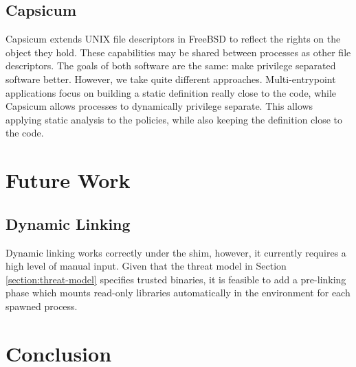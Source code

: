 \documentclass[sigplan]{acmart}
\begin{document}
\subsection{Capsicum}

Capsicum \citep{watson_capsicum_2010} extends UNIX file descriptors in FreeBSD to reflect the rights on the object they hold. These capabilities may be shared between processes as other file descriptors. The goals of both software are the same: make privilege separated software better. However, we take quite different approaches. Multi-entrypoint applications focus on building a static definition really close to the code, while Capsicum allows processes to dynamically privilege separate. This allows applying static analysis to the policies, while also keeping the definition close to the code.

\section{Future Work}

\subsection{Dynamic Linking}

Dynamic linking works correctly under the shim, however, it currently requires a high level of manual input. Given that the threat model in Section \ref{section:threat-model} specifies trusted binaries, it is feasible to add a pre-linking phase which mounts read-only libraries automatically in the environment for each spawned process.


\section{Conclusion}


\begin{acks}
\end{acks}




\appendix
\end{document}
